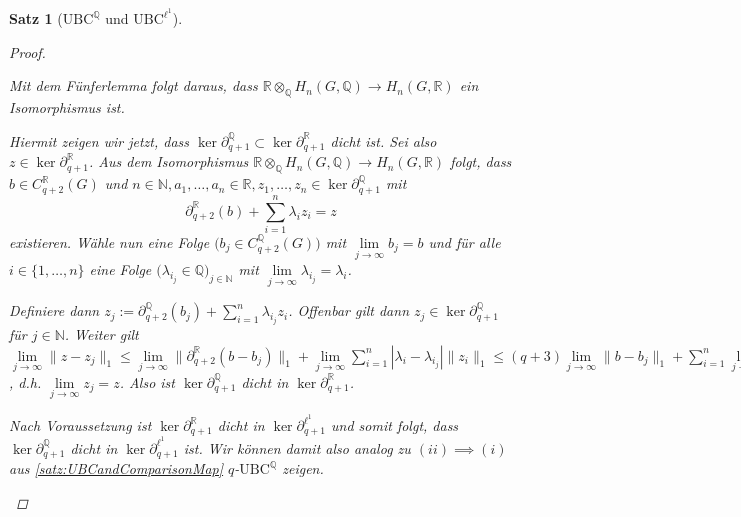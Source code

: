 \documentclass[a4paper,twoside,10pt]{scrreprt}
\newcommand {\img}{\text{im}~}
\newcommand{\N}{\mathbb{N}}
\newcommand{\Q}{\mathbb{Q}}
\newcommand{\R}{\mathbb{R}}
\newtheorem{satz}{Satz}[section]
\theoremstyle{definition}
\begin{document}
\begin{satz}[$\text{UBC}^{\Q}$ und $\text{UBC}^{\ell^1}$]
\begin{proof}
\begin{itemize}
\begin{center}
\end{center}
Mit dem Fünferlemma folgt daraus, dass $\R\otimes_{\Q}H_n(G,\Q)\to H_n(G,\R)$ ein Isomorphismus ist.\par
Hiermit zeigen wir jetzt, dass $\ker\partial_{q+1}^{\Q}\subset \ker\partial_{q+1}^{\R}$ dicht ist. Sei also $z\in \ker\partial_{q+1}^{\R}$. Aus dem Isomorphismus $\R\otimes_{\Q}H_n(G,\Q)\to H_n(G,\R)$ folgt, dass $b\in C_{q+2}^{\R}(G)$ und $n\in\N,a_1,\ldots,a_n\in\R,z_1,\ldots,z_n\in \ker\partial_{q+1}^{\Q}$ mit 
\begin{equation*}
\partial_{q+2}^{\R}(b)+\sum\limits_{i=1}^n\lambda_iz_i=z
\end{equation*}
existieren. Wähle nun eine Folge $\bigl(b_j\in C_{q+2}^{\Q}(G)\bigr)$ mit $\lim\limits_{j\to\infty}b_j=b$ und für alle $i\in \{1,\ldots,n\}$ eine Folge $\bigl(\lambda_{i_j}\in\Q\bigr)_{j\in\N}$ mit $\lim\limits_{j\to\infty}\lambda_{i_j}=\lambda_i$.\par
Definiere dann $z_j:=\partial_{q+2}^{\Q}(b_j)+\sum\limits_{i=1}^n\lambda_{i_j}z_i$. Offenbar gilt dann $z_j\in\ker\partial_{q+1}^{\Q}$ für $j\in\N$. Weiter gilt $\lim\limits_{j\to\infty}\|z-z_j\|_1\leq \lim\limits_{j\to\infty}\|\partial_{q+2}^{\R}(b-b_j)\|_1+\lim\limits_{j\to\infty}\sum\limits_{i=1}^n|\lambda_i-\lambda_{i_j}|\|z_i\|_1\leq (q+3)\lim\limits_{j\to\infty}\|b-b_j\|_1+\sum\limits_{i=1}^n\lim\limits_{j\to\infty}|\lambda_i-\lambda_{i_j}|\|z_i\|_1=0$, d.h. $\lim\limits_{j\to\infty}z_j=z$. Also ist $\ker\partial_{q+1}^{\Q}$ dicht in $\ker\partial_{q+1}^{\R}$.\par
Nach Voraussetzung ist $\ker \partial_{q+1}^{\R}$ dicht in $\ker \partial_{q+1}^{\ell^1}$ und somit folgt, dass $\ker \partial_{q+1}^{\Q}$ dicht in $\ker \partial_{q+1}^{\ell^1}$ ist. Wir können damit also analog zu $(ii)\implies (i)$ aus \cref{satz:UBCandComparisonMap} $q$-$\text{UBC}^{\Q}$ zeigen.
\end{itemize}
%
\end{proof}
\end{satz}
\end{document}
